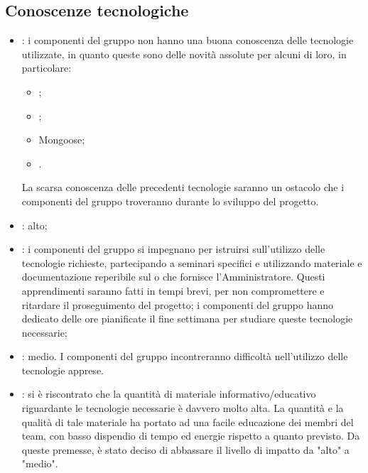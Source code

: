 \subsection{Conoscenze tecnologiche}
\begin{itemize}
\item {}: i componenti del gruppo non hanno una buona conoscenza delle tecnologie utilizzate, in quanto queste sono delle novità assolute per alcuni di loro, in particolare:
\begin{itemize}
\item {};
\item {};
\item Mongoose;
\item {}.
\end{itemize}
La scarsa conoscenza delle precedenti tecnologie saranno un ostacolo che i componenti del gruppo troveranno durante lo sviluppo del progetto.
\item {}: alto;
\item {}: i componenti del gruppo si impegnano per istruirsi sull'utilizzo delle tecnologie richieste, partecipando a seminari specifici e utilizzando materiale e documentazione reperibile sul  o che fornisce l'Amministratore. Questi apprendimenti saranno fatti in tempi brevi, per non compromettere e ritardare il proseguimento del progetto; i componenti del gruppo hanno dedicato delle ore pianificate il fine settimana per studiare queste tecnologie necessarie;
\item {}: medio. I componenti del gruppo incontreranno difficoltà nell'utilizzo delle tecnologie apprese.
\item {}: si è riscontrato che la quantità di materiale informativo/educativo riguardante le tecnologie necessarie è davvero molto alta. La quantità e la qualità di tale materiale ha portato ad una facile educazione dei membri del team, con basso dispendio di tempo ed energie rispetto a quanto previsto. Da queste premesse, è stato deciso di abbassare il livello di impatto da "alto" a "medio". 
\end{itemize}

